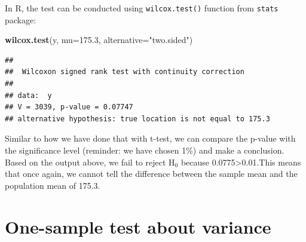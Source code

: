\documentclass[
]{book}
\newenvironment{Shaded}{\begin{snugshade}}{\end{snugshade}}
\newcommand{\DataTypeTok}[1]{\textcolor[rgb]{0.13,0.29,0.53}{#1}}
\newcommand{\FloatTok}[1]{\textcolor[rgb]{0.00,0.00,0.81}{#1}}
\newcommand{\KeywordTok}[1]{\textcolor[rgb]{0.13,0.29,0.53}{\textbf{#1}}}
\newcommand{\NormalTok}[1]{#1}
\newcommand{\StringTok}[1]{\textcolor[rgb]{0.31,0.60,0.02}{#1}}
\theoremstyle{definition}
\theoremstyle{definition}
\theoremstyle{definition}
\theoremstyle{definition}
\theoremstyle{remark}
\begin{document}
In R, the test can be conducted using \texttt{wilcox.test()} function from \texttt{stats} package:

\begin{Shaded}
\begin{Highlighting}[]
\KeywordTok{wilcox.test}\NormalTok{(y, }\DataTypeTok{mu=}\FloatTok{175.3}\NormalTok{, }\DataTypeTok{alternative=}\StringTok{"two.sided"}\NormalTok{)}
\end{Highlighting}
\end{Shaded}

\begin{verbatim}
## 
##  Wilcoxon signed rank test with continuity correction
## 
## data:  y
## V = 3039, p-value = 0.07747
## alternative hypothesis: true location is not equal to 175.3
\end{verbatim}

Similar to how we have done that with t-test, we can compare the p-value with the significance level (reminder: we have chosen 1\%) and make a conclusion. Based on the output above, we fail to reject H\(_0\) because 0.0775\textgreater0.01.This means that once again, we cannot tell the difference between the sample mean and the population mean of 175.3.

\hypertarget{statisticalTestsOneSampleVariance}{%
\section{One-sample test about variance}\label{statisticalTestsOneSampleVariance}}
\end{document}
